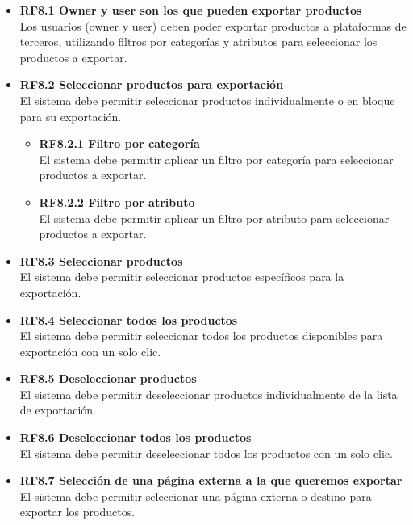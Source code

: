 \documentclass[12pt.a4paper]{article}
\begin{document}
\begin{itemize}
    \item \textbf{RF8.1 Owner y user son los que pueden exportar productos} \\
    Los usuarios (owner y user) deben poder exportar productos a plataformas de terceros, utilizando filtros por categorías y atributos para seleccionar los productos a exportar.

    \item \textbf{RF8.2 Seleccionar productos para exportación} \\
    El sistema debe permitir seleccionar productos individualmente o en bloque para su exportación.
    \begin{itemize}
        \item \textbf{RF8.2.1 Filtro por categoría} \\
        El sistema debe permitir aplicar un filtro por categoría para seleccionar productos a exportar.

        \item \textbf{RF8.2.2 Filtro por atributo} \\
        El sistema debe permitir aplicar un filtro por atributo para seleccionar productos a exportar.
    \end{itemize}

    \item \textbf{RF8.3 Seleccionar productos} \\
    El sistema debe permitir seleccionar productos específicos para la exportación.

    \item \textbf{RF8.4 Seleccionar todos los productos} \\
    El sistema debe permitir seleccionar todos los productos disponibles para exportación con un solo clic.

    \item \textbf{RF8.5 Deseleccionar productos} \\
    El sistema debe permitir deseleccionar productos individualmente de la lista de exportación.

    \item \textbf{RF8.6 Deseleccionar todos los productos} \\
    El sistema debe permitir deseleccionar todos los productos con un solo clic.

    \item \textbf{RF8.7 Selección de una página externa a la que queremos exportar} \\
    El sistema debe permitir seleccionar una página externa o destino para exportar los productos.


\end{itemize}
\end{document}
